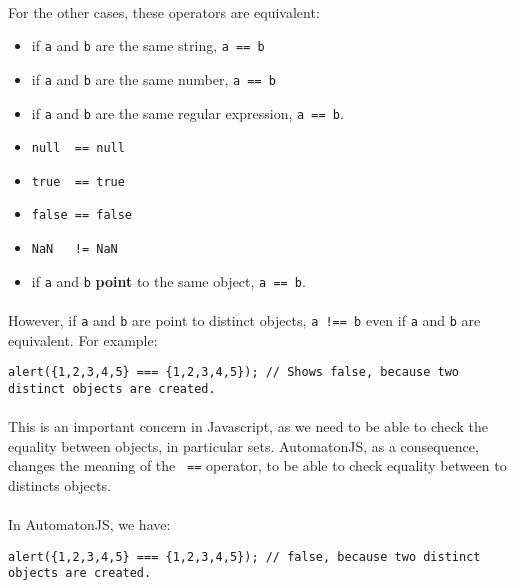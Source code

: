 \documentclass{article}
\begin{document}
\begin{sloppypar}
\paragraph{}
For the other cases, these operators are equivalent:
       
\begin{itemize}
	\item{ if \lstinline!a! and \lstinline!b! are the same string, \lstinline!a == b!}
	\item{ if \lstinline!a! and \lstinline!b! are the same number, \lstinline!a == b!}
	\item{ if \lstinline!a! and \lstinline!b! are the same regular expression, \lstinline!a == b!.}
	\item{ \lstinline!null  == null!}
	\item{ \lstinline!true  == true!}
	\item{ \lstinline!false == false!}
	\item{ \lstinline"NaN   != NaN"}
	\item{ if \lstinline!a! and \lstinline!b! {\bfseries point} to the same object, \lstinline!a == b!.}
\end{itemize}

\paragraph{}
However, if \lstinline!a! and \lstinline!b! are point to distinct objects, \lstinline"a !== b" even if \lstinline!a! and \lstinline!b! are equivalent. For example:
{\begin{lstlisting}
alert({1,2,3,4,5} === {1,2,3,4,5}); // Shows false, because two distinct objects are created.
\end{lstlisting}
}


       
\paragraph{}
This is an important concern in Javascript, as we need to be able to check the equality between objects, in particular sets. AutomatonJS, as a consequence, changes the meaning of the \lstinline! ==! operator, to be able to check equality between to distincts objects.

       
\paragraph{}
In AutomatonJS, we have:
{\begin{lstlisting}
alert({1,2,3,4,5} === {1,2,3,4,5}); // false, because two distinct objects are created.


\end{lstlisting}}
\end{sloppypar}
\end{document}
